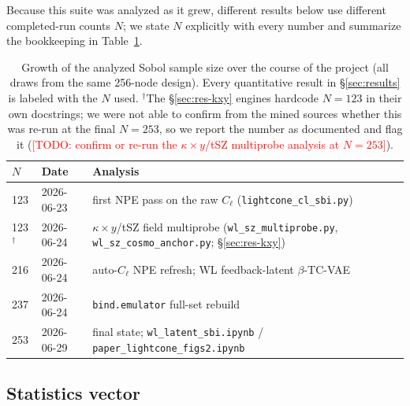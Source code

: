 \documentclass[11pt]{article}
\newcommand{\kappay}{\kappa\times y}
\newcommand{\todo}[1]{\textcolor{red}{[TODO: #1]}}
\begin{document}
Because this suite was analyzed as it grew, different results below use
different completed-run counts $N$; we state $N$ explicitly with every
number and summarize the bookkeeping in Table~\ref{tab:design-size}.

\begin{table}[t]
\centering
\caption{Growth of the analyzed Sobol sample size over the course of the
project (all draws from the same 256-node design). %
Every quantitative result in \S\ref{sec:results} is labeled with the $N$
used. $^\dagger$The \S\ref{sec:res-kxy} engines hardcode $N=123$ in their own
docstrings; we were not able to confirm from the mined sources whether this
was re-run at the final $N=253$, so we report the number as documented and
flag it (\todo{confirm or re-run the $\kappay$/tSZ multiprobe analysis at
$N=253$}).}
\label{tab:design-size}
\begin{tabular}{@{}lll@{}}
\toprule
$N$ & Date & Analysis \\
\midrule
123 & 2026-06-23 & first NPE pass on the raw $C_\ell$ (\texttt{lightcone\_cl\_sbi.py}) \\
123$^\dagger$ & 2026-06-24 & $\kappay$/tSZ field multiprobe (\texttt{wl\_sz\_multiprobe.py},
\texttt{wl\_sz\_cosmo\_anchor.py}; \S\ref{sec:res-kxy}) \\
216 & 2026-06-24 & auto-$C_\ell$ NPE refresh; WL feedback-latent $\beta$-TC-VAE \\
237 & 2026-06-24 & \texttt{bind.emulator} full-set rebuild \\
253 & 2026-06-29 & final state; \texttt{wl\_latent\_sbi.ipynb} / \texttt{paper\_lightcone\_figs2.ipynb} \\
\bottomrule
\end{tabular}
\end{table}

\subsection{Statistics vector}\label{sec:methods-stats}
\end{document}
